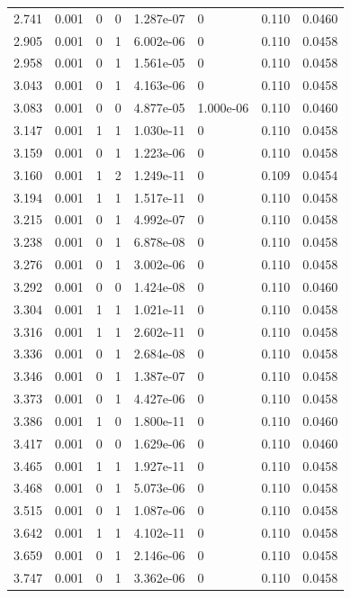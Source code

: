 \documentclass[preview]{standalone}
\begin{document}
{{{\begin{tabular}{L{1.2cm}C{1.2cm} C{0.3cm}C{0.5cm} C{1.4cm}C{1.4cm} C{1.4cm}C{1.4cm}}
  2.741  &  0.001  & 0     &  0 &  1.287e-07  & 0  & 0.110 &  0.0460   \\ 
  2.905  &  0.001  & 0     &  1 &  6.002e-06  & 0  & 0.110 &  0.0458   \\ 
  2.958  &  0.001  & 0     &  1 &  1.561e-05  & 0  & 0.110 &  0.0458   \\ 
  3.043  &  0.001  & 0     &  1 &  4.163e-06  & 0  & 0.110 &  0.0458   \\ 
  3.083  &  0.001  & 0     &  0 &  4.877e-05  & 1.000e-06  & 0.110 &  0.0460   \\ 
  3.147  &  0.001  & 1     &  1 &  1.030e-11  & 0  & 0.110 &  0.0458   \\ 
  3.159  &  0.001  & 0     &  1 &  1.223e-06  & 0  & 0.110 &  0.0458   \\ 
  3.160  &  0.001  & 1     &  2 &  1.249e-11  & 0  & 0.109 &  0.0454   \\ 
  3.194  &  0.001  & 1     &  1 &  1.517e-11  & 0  & 0.110 &  0.0458   \\ 
  3.215  &  0.001  & 0     &  1 &  4.992e-07  & 0  & 0.110 &  0.0458   \\ 
  3.238  &  0.001  & 0     &  1 &  6.878e-08  & 0  & 0.110 &  0.0458   \\ 
  3.276  &  0.001  & 0     &  1 &  3.002e-06  & 0  & 0.110 &  0.0458   \\ 
  3.292  &  0.001  & 0     &  0 &  1.424e-08  & 0  & 0.110 &  0.0460   \\ 
  3.304  &  0.001  & 1     &  1 &  1.021e-11  & 0  & 0.110 &  0.0458   \\ 
  3.316  &  0.001  & 1     &  1 &  2.602e-11  & 0  & 0.110 &  0.0458   \\ 
  3.336  &  0.001  & 0     &  1 &  2.684e-08  & 0  & 0.110 &  0.0458   \\ 
  3.346  &  0.001  & 0     &  1 &  1.387e-07  & 0  & 0.110 &  0.0458   \\ 
  3.373  &  0.001  & 0     &  1 &  4.427e-06  & 0  & 0.110 &  0.0458   \\ 
  3.386  &  0.001  & 1     &  0 &  1.800e-11  & 0  & 0.110 &  0.0460   \\ 
  3.417  &  0.001  & 0     &  0 &  1.629e-06  & 0  & 0.110 &  0.0460   \\ 
  3.465  &  0.001  & 1     &  1 &  1.927e-11  & 0  & 0.110 &  0.0458   \\ 
  3.468  &  0.001  & 0     &  1 &  5.073e-06  & 0  & 0.110 &  0.0458   \\ 
  3.515  &  0.001  & 0     &  1 &  1.087e-06  & 0  & 0.110 &  0.0458   \\ 
  3.642  &  0.001  & 1     &  1 &  4.102e-11  & 0  & 0.110 &  0.0458   \\ 
  3.659  &  0.001  & 0     &  1 &  2.146e-06  & 0  & 0.110 &  0.0458   \\ 
  3.747  &  0.001  & 0     &  1 &  3.362e-06  & 0  & 0.110 &  0.0458   \\ 
\hline 
\end{tabular} 

}}}
\end{document}
